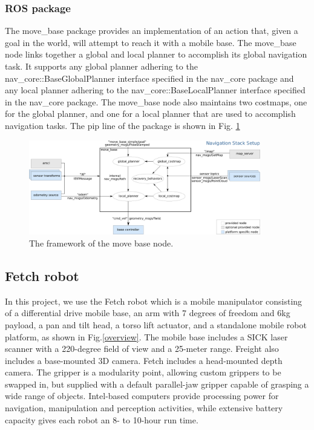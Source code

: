 \documentclass[12pt,draftclsnofoot,onecolumn]{IEEEtran}
\begin{document}
	\subsubsection{ROS package}
	The move\_base package provides an implementation of an action that, given a goal in the world, will attempt to reach it with a mobile base. The move\_base node links together a global and local planner to accomplish its global navigation task. 
	It supports any global planner adhering to the nav\_core::BaseGlobalPlanner interface specified in the nav\_core package 
	and any local planner adhering to the nav\_core::BaseLocalPlanner interface specified in the nav\_core package. 
	The move\_base node also maintains two costmaps, one for the global planner, 
	and one for a local planner that are used to accomplish navigation tasks.
	The pip line of the package is shown in Fig. \ref{movebase}
	\begin{figure}[H]    %
		\centering
		\includegraphics[width=0.9\textwidth]{img/movebase.png}
		\caption{
			The framework of the move base node.
		}
		\label{movebase}
	\end{figure}
	
	\subsection{Fetch robot}   
	In this project, we use the Fetch robot \cite{wise2016fetch} which is a mobile manipulator consisting of a differential drive mobile base, an arm with 7 degrees of freedom and 6kg payload, a pan and tilt head, a torso lift actuator, and a standalone mobile robot platform, as shown in Fig.\ref{overview}. The mobile base includes a SICK laser scanner with a 220-degree field of view and a 25-meter range. Freight also includes a base-mounted 3D camera. Fetch includes a head-mounted depth camera. The gripper is a modularity point, allowing custom grippers to be swapped in, but supplied with a default parallel-jaw gripper capable of grasping a wide range of objects. Intel-based computers provide processing power for navigation, manipulation and perception activities, while extensive battery capacity gives each robot an 8- to 10-hour run time.
   
\end{document}

